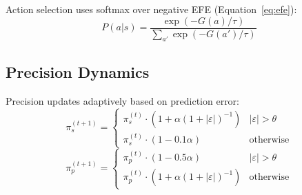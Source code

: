 \documentclass[10pt,letterpaper]{article}
\begin{document}
\begin{table}[ht]
\centering
\caption{Motor command types from EFE minimization.}
\label{tab:motor}
\small
{}
\end{table}

Action selection uses softmax over negative EFE (Equation~\ref{eq:efe}):
\begin{equation}
P(a|s) = \frac{\exp(-G(a)/\tau)}{\sum_{a'}\exp(-G(a')/\tau)}
\end{equation}

\subsection{Precision Dynamics}

Precision updates adaptively based on prediction error:
\begin{equation}
\pi_s^{(t+1)} = \begin{cases}
\pi_s^{(t)} \cdot (1 + \alpha(1+|\varepsilon|)^{-1}) & |\varepsilon| > \theta \\
\pi_s^{(t)} \cdot (1 - 0.1\alpha) & \text{otherwise}
\end{cases}
\end{equation}
\begin{equation}
\pi_p^{(t+1)} = \begin{cases}
\pi_p^{(t)} \cdot (1 - 0.5\alpha) & |\varepsilon| > \theta \\
\pi_p^{(t)} \cdot (1 + \alpha(1+|\varepsilon|)^{-1}) & \text{otherwise}
\end{cases}
\end{equation}
\end{document}
